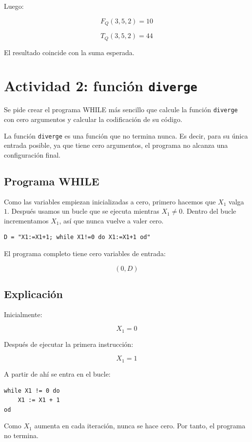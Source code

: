 \documentclass[10pt]{article}
\begin{document}
Luego:

\[
    F_Q(3,5,2) = 10
\]

\[
    T_Q(3,5,2) = 44
\]

El resultado coincide con la suma esperada.

\section{Actividad 2: función \texttt{diverge}}

Se pide crear el programa WHILE más sencillo que calcule la función \texttt{diverge} con cero argumentos y calcular la codificación de su código.

La función \texttt{diverge} es una función que no termina nunca. Es decir, para su única entrada posible, ya que tiene cero argumentos, el programa no alcanza una configuración final.

\subsection{Programa WHILE}

Como las variables empiezan inicializadas a cero, primero hacemos que $X_1$ valga $1$. Después usamos un bucle que se ejecuta mientras $X_1 \neq 0$. Dentro del bucle incrementamos $X_1$, así que nunca vuelve a valer cero.

\begin{verbatim}
D = "X1:=X1+1; while X1!=0 do X1:=X1+1 od"
\end{verbatim}

El programa completo tiene cero variables de entrada:

\[
    (0, D)
\]

\subsection{Explicación}

Inicialmente:

\[
    X_1 = 0
\]

Después de ejecutar la primera instrucción:

\[
    X_1 = 1
\]

A partir de ahí se entra en el bucle:

\begin{verbatim}
while X1 != 0 do
    X1 := X1 + 1
od
\end{verbatim}

Como $X_1$ aumenta en cada iteración, nunca se hace cero. Por tanto, el programa no termina.
\end{document}
